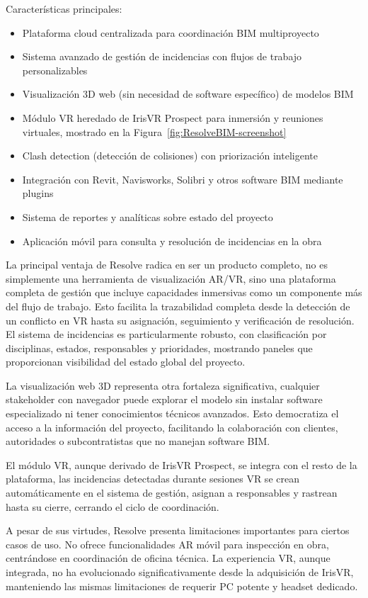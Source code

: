 Características principales:
\begin{itemize} 

\item Plataforma cloud centralizada para coordinación BIM multiproyecto
\item Sistema avanzado de gestión de incidencias con flujos de trabajo personalizables
\item Visualización 3D web (sin necesidad de software específico) de modelos BIM
\item Módulo VR heredado de IrisVR Prospect para inmersión y reuniones virtuales, mostrado en la Figura~\ref{fig:ResolveBIM-screenshot}
\item Clash detection (detección de colisiones) con priorización inteligente
\item Integración con Revit, Navisworks, Solibri y otros software BIM mediante plugins
\item Sistema de reportes y analíticas sobre estado del proyecto
\item Aplicación móvil para consulta y resolución de incidencias en la obra
\end{itemize}
La principal ventaja de Resolve radica en ser un producto completo, no es simplemente una herramienta de visualización AR/VR, sino una plataforma completa de gestión que incluye capacidades inmersivas como un componente más del flujo de trabajo. Esto facilita la trazabilidad completa desde la detección de un conflicto en VR hasta su asignación, seguimiento y verificación de resolución. El sistema de incidencias es particularmente robusto, con clasificación por disciplinas, estados, responsables y prioridades, mostrando paneles que proporcionan visibilidad del estado global del proyecto.

La visualización web 3D representa otra fortaleza significativa, cualquier stakeholder con navegador puede explorar el modelo sin instalar software especializado ni tener conocimientos técnicos avanzados. Esto democratiza el acceso a la información del proyecto, facilitando la colaboración con clientes, autoridades o subcontratistas que no manejan software BIM.

El módulo VR, aunque derivado de IrisVR Prospect, se integra con el resto de la plataforma, las incidencias detectadas durante sesiones VR se crean automáticamente en el sistema de gestión, asignan a responsables y rastrean hasta su cierre, cerrando el ciclo de coordinación.

A pesar de sus virtudes, Resolve presenta limitaciones importantes para ciertos casos de uso. No ofrece funcionalidades AR móvil para inspección en obra, centrándose en coordinación de oficina técnica. La experiencia VR, aunque integrada, no ha evolucionado significativamente desde la adquisición de IrisVR, manteniendo las mismas limitaciones de requerir PC potente y headset dedicado.

